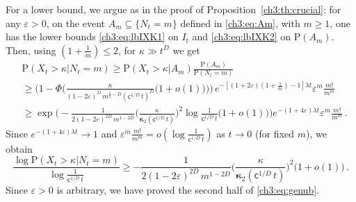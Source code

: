 \documentclass[a4paper,reqno,11pt]{amsart}
\numberwithin{equation}{section}
\newcommand{\PEfont}{\mathrm}
\renewcommand{\P}{\ensuremath{\PEfont P}}
\renewcommand{\epsilon}{\varepsilon}
\newcommand\sfc{\mathsf{c}}
\newcommand\bkappa{\boldsymbol{\kappa}}
\newcommand\blue{\color{blue}}
\begin{document}
For a lower bound, we argue as in the proof 
of Proposition~\ref{ch3:th:crucial}:
for any $\epsilon > 0$, on the event $A_m \subseteq \{N_t = m\}$
defined in \eqref{ch3:eq:Am}, with $m \ge 1$, one has the lower bounds \eqref{ch3:eq:lbIXK1}
on $I_t$ and \eqref{ch3:eq:lbIXK2} on $\P(A_m)$. 
Then, using $(1+\frac{1}{m}) \le 2$, for $\kappa \gg t^D$ we get
\begin{equation*} 
\begin{split}
	 &\P( X_t >\kappa  | N_t = m) \ge
	  \P(X_t>\kappa | A_m) \frac{\P(A_m)}{\P(N_t=m)} \\
	  & \geq \Bigg(1 - \Phi\bigg(
	\frac{\kappa}{(1-2\epsilon)^{D} \,
	m^{\frac{1}{2}-D} (\sfc^{1/D} \, t)^D}
  \big(1+o(1)\big) \bigg) \Bigg) \, e^{-[(1+2\varepsilon)(1+\frac{1}{m})-1]\lambda t} 
  \epsilon^m 
  \frac{m!}{m^m} \\
  & \ge \exp\bigg( -\frac{1}{2 (1-2\epsilon)^{2D} \, m^{1-2D}}
  \bigg(\frac{\kappa}{\bkappa_2(\sfc^{1/D} \, t)}\bigg)^2 
  \log\frac{1}{\sfc^{1/D} \, t}
  \big(1+o(1)\big)  \bigg) e^{-(1+4\epsilon)\lambda t} \epsilon^m 
  \frac{m!}{m^m}  
  \,.
\end{split}
\end{equation*}
Since $e^{-(1+4\epsilon)\lambda t} \to 1$ and $\epsilon^m \frac{m!}{m^m}
= o(\log \frac{1}{\sfc^{1/D} \, t})$ as $t \to 0$ (for fixed $m$), we obtain
\begin{equation*}
	\frac{\log \P( X_t >\kappa  | N_t = m)}{\log \frac{1}{\sfc^{1/D} \, t}}
	\ge -\frac{1}{2 (1-2\epsilon)^{2D} \, m^{1-2D}}
  \bigg(\frac{\kappa}{\bkappa_2( \sfc^{1/D} \, t)}\bigg)^2 
  \big(1 + o(1) \big) \,.
\end{equation*}
Since $\epsilon > 0$ is arbitrary, we have proved the second half of \eqref{ch3:eq:genub}.
\end{document}
